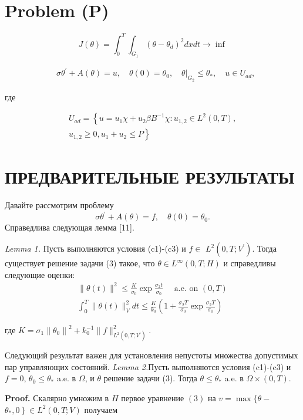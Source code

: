\documentclass[10pt]{article}
\begin{document}
\section{Problem (P)}
\[
J(\theta)=\int_{0}^{T} \int_{G_{1}}\left(\theta-\theta_{d}\right)^{2} d x d t \rightarrow \inf
\]

\[
\begin{aligned}
& \sigma \theta^{\prime}+A(\theta)=u, \quad \theta(0)=\theta_{0},\left.\quad
\theta\right|_{G_{2}} \leq \theta_{*}, \quad u \in U_{a d},
\end{aligned}
\]

где

\[
\begin{array}{r}
U_{a d}=\left\{u=u_{1} \chi+u_{2} \beta B^{-1} \chi: u_{1,2} \in L^{2}(0, T),\right. \\
\left.u_{1,2} \geq 0, u_{1}+u_{2} \leq P\right\}
\end{array}
\]

\section{ПРЕДВАРИТЕЛЬНЫЕ РЕЗУЛЬТАТЫ}
Давайте рассмотрим проблему
\[
\sigma \theta^{\prime}+A(\theta)=f, \quad \theta(0)=\theta_{0} .
\]
Справедлива следующая лемма [11].

\textit{Lemma 1.}
Пусть выполняются условия (c1)-(c3) и $f \in$ $L^{2}\left(0, T ; V^{\prime}\right)$.
Тогда существует решение задачи (3) такое, что $\theta \in L^{\infty}(0, T ; H)$
и справедливы следующие оценки:
\[
\begin{gathered}
\|\theta(t)\|^{2} \leq \frac{K}{\sigma_{0}} \exp \frac{\sigma_{2} t}{\sigma_{0}}
\quad \text { a.e. on }(0, T) \\
\int_{0}^{T}\|\theta(t)\|_{V}^{2} d t \leq
\frac{K}{k_{0}}\left(1+\frac{\sigma_{2} T}{\sigma_{0}} \exp
\frac{\sigma_{2} T}{\sigma_{0}}\right)
\end{gathered}
\]

где $K=\sigma_{1}\left\|\theta_{0}\right\|^{2}+k_{0}^{-1}\|f\|_{L^{2}\left(0, T ; V^{\prime}\right)}^{2}$.

Следующий результат важен для установления непустоты множества допустимых пар управляющих состояний.
\textit{Lemma 2.}Пусть выполняются условия (c1)-(c3) и
$f=0$, $\theta_{0} \leq \theta_{*}$ a.e. в $\Omega$, и $\theta$ решение задачи (3).
Тогда $\theta \leq \theta_{*}$ a.e. в $\Omega \times(0, T)$.

\textbf{Proof.}
Скалярно умножим в $H$ первое уравнение $(3)$ на
$v=\max \{\theta-$ $\left.\theta_{*}, 0\right\} \in L^{2}(0, T ; V)$ получаем
\end{document}

